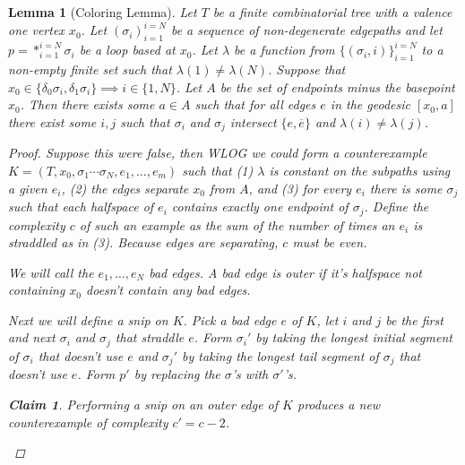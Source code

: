 \documentclass{article}
\theoremstyle{mystyle}
\newtheorem{lem}{Lemma}[section]
\newtheorem*{claim*}{Claim}
\theoremstyle{remark}
\begin{document}
\begin{lem}
	[Coloring Lemma]
	Let \(T\) be a finite combinatorial tree with a valence one vertex \(x_{0}\). Let \((\sigma_{i} )_{i=1}^{i=N}\) be a sequence of non-degenerate edgepaths and let \(p = *_{i=1}^{i=N} \sigma_{i}\) be a loop based at \(x_{0}\). Let \(\lambda\) be a function from \(\{(\sigma_{i} , i )\}_{i=1}^{i=N}\) to a non-empty finite set such that \(\lambda (1) \neq \lambda (N)\). Suppose that \(x_{0} \in \{\delta_{0} \sigma_{i} , \delta_{1} \sigma_{i} \} \implies i \in \{1,N\}\). Let \(A\) be the set of endpoints minus the basepoint \(x_{ 0}\). Then there exists some \(a \in A\) such that for all edges \(e\) in the geodesic \([x_{0} , a]\) there exist some \(i, j\) such that \(\sigma_{i}\) and \(\sigma_{j}\) intersect \(\{e,\overline{e}\}\) and \(\lambda ( i ) \neq \lambda ( j )\).

	\begin{proof}
		Suppose this were false, then WLOG we could form a counterexample \(K = (T,x_{0}, \sigma_{1} \cdots \sigma_{N} , e_{1} , \ldots, e_{m})\) such that (1) \(\lambda\) is constant on the subpaths using a given \(e_{i}\), (2) the edges separate \(x_{0}\) from \(A\), and (3) for every \(e_{ i}\) there is some \(\sigma_{j}\) such that each halfspace of \(e_{i}\) contains exactly one endpoint of \(\sigma_{j}\). Define the complexity \(c\) of such an example as the sum of the number of times an \(e_{i}\) is {\em straddled} as in (3). Because edges are separating, \(c\) must be even. 

		We will call the \(e_{1},\ldots,e_{N}\) {\em bad} edges. A bad edge is {\em outer} if it's halfspace not containing \(x_{0}\) doesn't contain any bad edges.


		Next we will define a {\em snip} on \(K\). Pick a bad edge \(e\)  of \(K\), let \(i\) and \(j\) be the first and next \(\sigma_{i}\) and \(\sigma_{j}\) that straddle \(e\). Form \(\sigma_{i}'\) by taking the longest initial segment of \(\sigma_{i}\) that doesn't use \(e\) and \(\sigma_{j} '\) by taking the longest tail segment of \(\sigma_{j}\) that doesn't use \(e\). Form \(p'\) by replacing the \(\sigma\)'s with \(\sigma '\)'s.
		\begin{claim*}Performing a snip on an outer edge of \(K\) produces a new counterexample of complexity \(c'=c-2\).

		\end{claim*}
	\end{proof}
\end{lem}
\end{document}
